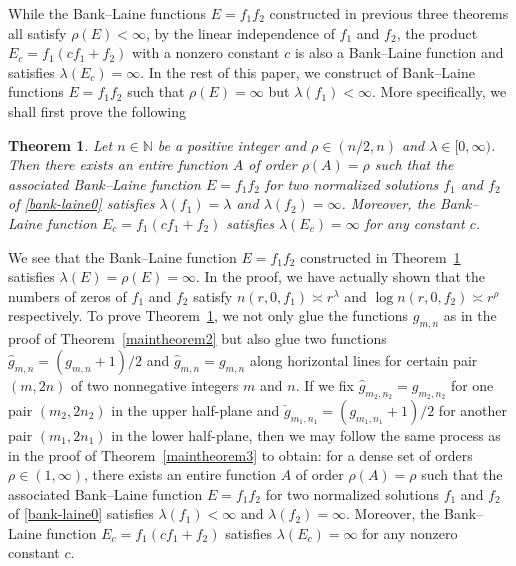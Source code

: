 \documentclass[12pt]{amsart}
\numberwithin{equation}{section}
\newtheorem{theorem}{Theorem}[section]
\begin{document}
While the Bank--Laine functions $E=f_1f_2$ constructed in previous three theorems all satisfy $\rho(E)<\infty$, by the linear independence of $f_1$ and $f_2$, the product $E_c=f_1(cf_1+f_2)$ with a nonzero constant $c$ is also a Bank--Laine function and satisfies $\lambda(E_c)=\infty$. In the rest of this paper, we construct of Bank--Laine functions $E=f_1f_2$ such that $\rho(E)=\infty$ but $\lambda(f_1)<\infty$. More specifically, we shall first prove the following

\begin{theorem}\label{maintheorem5}
Let $n\in \mathbb{N}$ be a positive integer and $\rho\in (n/2,n)$ and $\lambda\in[0,\infty)$. Then there exists an entire function $A$ of order $\rho(A)=\rho$ such that the associated Bank--Laine function $E=f_1f_2$ for two normalized solutions $f_1$ and $f_2$ of \eqref{bank-laine0} satisfies $\lambda(f_1)=\lambda$ and $\lambda(f_2)=\infty$. Moreover, the Bank--Laine function $E_c=f_1(cf_1+f_2)$ satisfies $\lambda(E_c)=\infty$ for any constant $c$.
\end{theorem}

We see that the Bank--Laine function $E=f_1f_2$ constructed in Theorem~\ref{maintheorem5} satisfies $\lambda(E)=\rho(E)=\infty$. In the proof, we have actually shown that the numbers of zeros of $f_1$ and $f_2$ satisfy $n(r,0,f_1)\asymp r^{\lambda}$ and $\log n(r,0,f_2)\asymp r^{\rho}$ respectively. To prove Theorem~\ref{maintheorem5}, we not only glue the functions $g_{m,n}$ as in the proof of Theorem~\ref{maintheorem2} but also glue two functions $\hat{g}_{m,n}=(g_{m,n}+1)/2$ and $\hat{g}_{m,n}=g_{m,n}$ along horizontal lines for certain pair $(m,2n)$ of two nonnegative integers $m$ and $n$. If we fix $\hat{g}_{m_2,n_2}=g_{m_2,n_2}$ for one pair $(m_2,2n_2)$ in the upper half-plane and $\check{g}_{m_1,n_1}=(g_{m_1,n_1}+1)/2$ for another pair $(m_1,2n_1)$ in the lower half-plane, then we may follow the same process as in the proof of Theorem~\ref{maintheorem3} to obtain: for a dense set of orders $\rho\in(1,\infty)$, there exists an entire function $A$ of order $\rho(A)=\rho$ such that the associated Bank--Laine function $E=f_1f_2$ for two normalized solutions $f_1$ and $f_2$ of \eqref{bank-laine0} satisfies $\lambda(f_1)<\infty$ and $\lambda(f_2)=\infty$. Moreover, the Bank--Laine function $E_c=f_1(cf_1+f_2)$ satisfies $\lambda(E_c)=\infty$ for any nonzero constant $c$.
\end{document}
